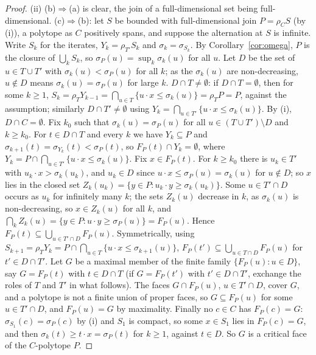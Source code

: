\documentclass[11pt]{amsart}
\theoremstyle{definition}
\begin{document}
\begin{proof}
(ii) (b)$\Rightarrow$(a) is clear, the join of a full-dimensional set
being full-dimensional. (c)$\Rightarrow$(b): let $S$ be bounded with
full-dimensional join $P=\rho_CS$ (by (i)), a polytope as $C$ positively
spans, and suppose the alternation at $S$ is infinite. Write $S_k$ for
the iterates, $Y_k=\rho_{T'}S_k$ and $\sigma_k=\sigma_{S_k}$. By
Corollary~\ref{cor:omega}, $P$ is the closure of $\bigcup_kS_k$, so
$\sigma_P(u)=\sup_k\sigma_k(u)$ for all $u$. Let $D$ be the set of $u\in T\cup T'$
with $\sigma_k(u)<\sigma_P(u)$ for all $k$; as the $\sigma_k(u)$ are
non-decreasing, $u\notin D$ means $\sigma_k(u)=\sigma_P(u)$ for large
$k$. $D\cap T\ne\emptyset$: if $D\cap T=\emptyset$, then for some $k\ge
1$, $S_k=\rho_TY_{k-1}=\bigcap_{u\in T}\{u\cdot x\le\sigma_k(u)\}=
\rho_TP=P$, against the assumption; similarly $D\cap T'\ne\emptyset$ using $Y_k=
\bigcap_{u\in T'}\{u\cdot x\le\sigma_k(u)\}$. By (i), $D\cap C=
\emptyset$. Fix $k_0$ such that $\sigma_k(u)=\sigma_P(u)$ for all $u\in(T\cup
T')\setminus D$ and $k\ge k_0$. For $t\in D\cap T$ and every $k$ we have
$Y_k\subseteq P$ and $\sigma_{k+1}(t)=\sigma_{Y_k}(t)<\sigma_P(t)$, so
$F_P(t)\cap Y_k=\emptyset$, where $Y_k=P\cap\bigcap_{u\in T'}\{u\cdot x
\le\sigma_k(u)\}$. Fix $x\in F_P(t)$. For $k\ge k_0$ there is $u_k\in
T'$ with $u_k\cdot x>\sigma_k(u_k)$, and $u_k\in D$ since $u\cdot x\le
\sigma_P(u)=\sigma_k(u)$ for $u\notin D$; so $x$ lies in the closed set
$Z_k(u_k)=\{y\in P:u_k\cdot y\ge\sigma_k(u_k)\}$. Some $u\in T'\cap D$
occurs as $u_k$ for infinitely many $k$; the sets $Z_k(u)$ decrease in
$k$, as $\sigma_k(u)$ is non-decreasing, so $x\in Z_k(u)$ for all $k$,
and $\bigcap_kZ_k(u)=\{y\in P:u\cdot y\ge\sigma_P(u)\}=F_P(u)$. Hence
$F_P(t)\subseteq\bigcup_{u\in T'\cap D}F_P(u)$. Symmetrically, using $S_{k+1}=\rho_TY_k=P\cap\bigcap_{u\in T}
\{u\cdot x\le\sigma_{k+1}(u)\}$, $F_P(t')\subseteq\bigcup_{u\in T\cap D}
F_P(u)$ for $t'\in D\cap T'$. Let $G$ be a maximal member of the finite
family $\{F_P(u):u\in D\}$, say $G=F_P(t)$ with $t\in D\cap T$ (if $G=
F_P(t')$ with $t'\in D\cap T'$, exchange the roles of $T$ and $T'$ in
what follows). The
faces $G\cap F_P(u)$, $u\in T'\cap D$, cover $G$, and a polytope is not
a finite union of proper faces, so $G\subseteq F_P(u)$ for some $u\in
T'\cap D$, and $F_P(u)=G$ by maximality. Finally no $c\in C$ has $F_P(c)
=G$: $\sigma_{S_1}(c)=\sigma_P(c)$ by (i) and $S_1$ is compact, so some
$x\in S_1$ lies in $F_P(c)=G$, and then $\sigma_k(t)\ge t\cdot x=
\sigma_P(t)$ for $k\ge1$, against $t\in D$. So $G$ is a critical face of
the $C$-polytope $P$.


\end{proof}
\end{document}
